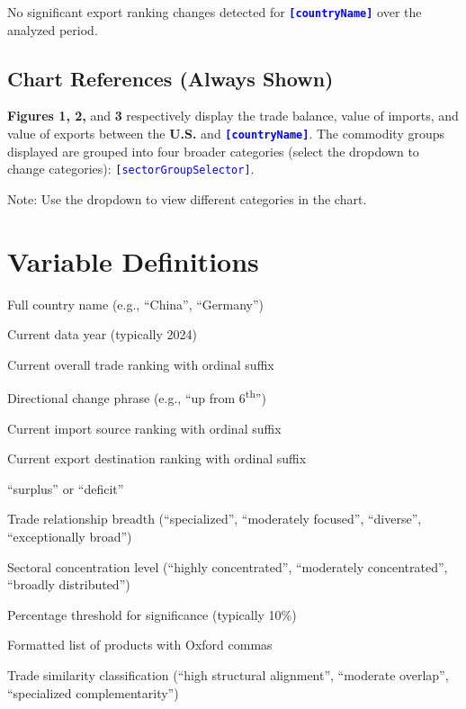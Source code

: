 \documentclass[12pt]{article}
\newcommand{\var}[1]{\textcolor{blue}{\texttt{[#1]}}}
\newcommand{\bold}[1]{\textbf{#1}}
\begin{document}
No significant export ranking changes detected for \bold{\var{countryName}} over the analyzed period.

\subsection{Chart References (Always Shown)}
\bold{Figures 1, 2,} and \bold{3} respectively display the trade balance, value of imports, and value of exports between the \bold{U.S.} and \bold{\var{countryName}}. The commodity groups displayed are grouped into four broader categories (select the dropdown to change categories): \var{sectorGroupSelector}.

Note: Use the dropdown to view different categories in the chart.

\section*{Variable Definitions}

\begin{description}[style=nextline]
\item[\var{countryName}] Full country name (e.g., ``China'', ``Germany'')
\item[\var{latestYear}] Current data year (typically 2024)
\item[\var{tradeRank\_latest}] Current overall trade ranking with ordinal suffix
\item[\var{tradeDirection}] Directional change phrase (e.g., ``up from 6\textsuperscript{th}'')
\item[\var{importRank\_latest}] Current import source ranking with ordinal suffix
\item[\var{exportRank\_latest}] Current export destination ranking with ordinal suffix
\item[\var{currentStatusText}] ``surplus'' or ``deficit''
\item[\var{scope}] Trade relationship breadth (``specialized'', ``moderately focused'', ``diverse'', ``exceptionally broad'')
\item[\var{concentration}] Sectoral concentration level (``highly concentrated'', ``moderately concentrated'', ``broadly distributed'')
\item[\var{threshold}] Percentage threshold for significance (typically 10\%)
\item[\var{productList}] Formatted list of products with Oxford commas
\item[\var{alignment}] Trade similarity classification (``high structural alignment'', ``moderate overlap'', ``specialized complementarity'')
\end{description}
\end{document}
